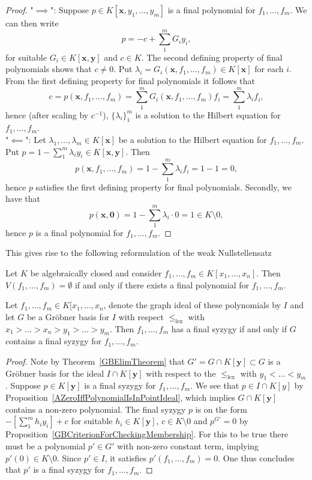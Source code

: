 \begin{proof}
    "$\implies$": Suppose $p\in K[\mathbf{x},y_1,\dots,y_m]$ is a final polynomial for $f_1,\dots,f_m$. We can then write
    $$p = -c+\sum_1^m G_iy_i,$$
    for suitable $G_i\in K[\mathbf{x},\mathbf{y}]$ and $c\in K$. The second defining property of final polynomials shows that $c\neq 0$. Put $\lambda_i = G_i(\mathbf{x},f_1,\dots,f_m)\in K[\mathbf{x}]$ for each $i$. From the first defining property for final polynomials it follows that 
    $$c = p(\mathbf{x},f_1,\dots,f_m)= \sum_1^m G_i(\mathbf{x},f_1,\dots,f_m)f_i = \sum_1^m \lambda_if_i,$$
    hence (after scaling by $c^{-1}$), $\{\lambda_i\}_1^m$ is a solution to the Hilbert equation for $f_1,\dots,f_m$.\\
    "$\impliedby$": Let $\lambda_1,\dots,\lambda_m\in K[\mathbf{x}]$ be a solution to the Hilbert equation for $f_1,\dots,f_m$. Put $p = 1-\sum_1^m \lambda_iy_i\in K[\mathbf{x},\mathbf{y}]$. Then
    $$p(\mathbf{x},f_1,\dots,f_m)=1-\sum_1^m \lambda_if_i = 1-1=0,$$
    hence $p$ satisfies the first defining property for final polynomials. Secondly, we have that 
    $$p(\mathbf{x},\mathbf{0})= 1-\sum_1^m \lambda_i\cdot 0 = 1\in K\setminus 0,$$
    hence $p$ is a final polynomial for $f_1,\dots,f_m$.
\end{proof}
This gives rise to the following reformulation of the weak Nullstellensatz
\begin{theorem}
    Let $K$ be algebraically closed and consider $f_1,\dots,f_m\in K[x_1,\dots,x_n]$. Then $V(f_1,\dots,f_m)=\emptyset$ if and only if there exists a final polynomial for $f_1,\dots,f_m$.
\end{theorem}
\begin{proposition}\label{GröbnerBasisTheoremForFinalPolynomials}
    Let $f_1,\dots,f_m\in K[x_1,\dots,x_n$, denote the graph ideal of these polynomials by $I$ and let $G$ be a Gröbner basis for $I$ with respect $\leq_{\text{lex}}$ with $x_1>\dots>x_n>y_1>\dots>y_m$. Then $f_1,\dots,f_m$ has a final syzygy if and only if $G$ contains a final syzygy for $f_1,\dots,f_m$.
\end{proposition}
\begin{proof}
    Note by Theorem~\ref{GBElimTheorem} that $G'=G \cap K[\mathbf{y}] \subset G$ is a Gröbner basis for the ideal $I \cap K[\mathbf{y}]$ with respect to the $\leq_{\text{lex}}$ with $y_1<\dots <y_m$. Suppose $p\in K[\mathbf{y}]$ is a final syzygy for $f_1,\dots,f_m$. We see that $p\in I \cap K[y]$ by Proposition~\ref{AZeroIffPolynomialIsInPointIdeal}, which implies $\widehat{G} \cap K[\mathbf{y}]$ contains a non-zero polynomial. The final syzygy $p$ is on the form $-\left[\sum_{1}^m h_iy_i\right] + c$ for suitable $h_i\in K[\mathbf{y}]$, $c\in K\setminus 0$ and $p^{G'}=0$ by Proposition~\ref{GBCriterionForCheckingMembership}. For this to be true there must be a polynomial $p' \in G'$ with non-zero constant term, implying $p'(0)\in K\setminus 0$. Since $p'\in I$, it satisfies $p'(f_1,\dots,f_m)=0$. One thus concludes that $p'$  is a final syzygy for $f_1,\dots,f_m$.
\end{proof}
